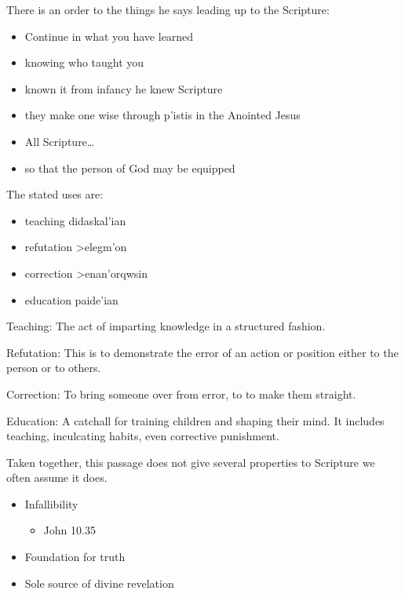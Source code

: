 \documentclass{beamer}
\begin{document}
\begin{frame}
  There is an order to the things he says leading up to the Scripture:\pause
  \begin{itemize}
	\item Continue in what you have learned\pause
	\item knowing who taught you\pause
	\item known it from infancy he knew Scripture\pause
	\item they make one wise through \textgreek{p'istis} in the Anointed Jesus\pause
	\item All Scripture\ldots\pause
	\item so that the person of God may be equipped
  \end{itemize}
\end{frame}

\begin{frame}
  The stated uses are:\pause
  \begin{itemize}
	\item teaching \textgreek{didaskal'ian}\pause
	\item refutation \textgreek{>elegm'on}\pause
	\item correction \textgreek{>enan'orqwsin}\pause
	\item education \textgreek{paide'ian}
  \end{itemize}
\end{frame}

\begin{frame}
  Teaching: The act of imparting knowledge in a structured fashion.
\end{frame}

\begin{frame}
  Refutation: This is to demonstrate the error of an action or position either to the person or to others.
\end{frame}

\begin{frame}
  Correction: To bring someone over from error, to to make them straight.
\end{frame}

\begin{frame}
  Education: A catchall for training children and shaping their mind.
  It includes teaching, inculcating habits, even corrective punishment.
\end{frame}

\begin{frame}
  Taken together, this passage does not give several properties to Scripture we often assume it does.\pause
  \begin{itemize}
	\item Infallibility\pause
	  \begin{itemize}
		\item John 10.35\pause
	  \end{itemize}
	\item Foundation for truth\pause
	\item Sole source of divine revelation
  \end{itemize}
\end{frame}
\end{document}
